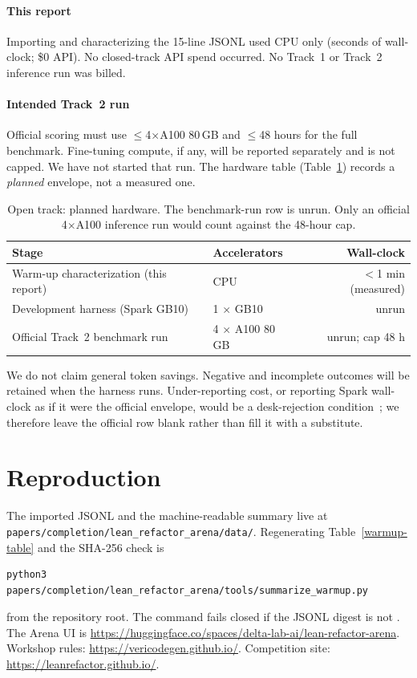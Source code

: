 \documentclass{article}
\begin{document}
\paragraph{This report} Importing and characterizing the 15-line JSONL used CPU only (seconds of wall-clock; \$0 API). No closed-track API spend occurred. No Track~1 or Track~2 inference run was billed.

\paragraph{Intended Track~2 run} Official scoring must use $\le$4$\times$A100 80\,GB and $\le$48 hours for the full benchmark. Fine-tuning compute, if any, will be reported separately and is not capped. We have not started that run. The hardware table (Table~\ref{hardware-table}) records a \emph{planned} envelope, not a measured one.

\begin{table}[!ht]
  \caption{Open track: planned hardware. The benchmark-run row is unrun. Only an official 4$\times$A100 inference run would count against the 48-hour cap.}
  \label{hardware-table}
  \centering
  \begin{tabular}{llr}
    \toprule
    Stage & Accelerators & Wall-clock \\
    \midrule
    Warm-up characterization (this report) & CPU & $<$1 min (measured) \\
    Development harness (Spark GB10) & 1 $\times$ GB10 & unrun \\
    Official Track~2 benchmark run & 4 $\times$ A100 80\,GB & unrun; cap 48 h \\
    \bottomrule
  \end{tabular}
\end{table}

We do not claim general token savings. Negative and incomplete outcomes will be retained when the harness runs. Under-reporting cost, or reporting Spark wall-clock as if it were the official envelope, would be a desk-rejection condition~\cite{vericodegen2026}; we therefore leave the official row blank rather than fill it with a substitute.

\section{Reproduction}

The imported JSONL and the machine-readable summary live at
\texttt{papers/completion/lean\_refactor\_arena/data/}.
Regenerating Table~\ref{warmup-table} and the SHA-256 check is
\begin{verbatim}
python3 papers/completion/lean_refactor_arena/tools/summarize_warmup.py
\end{verbatim}
from the repository root. The command fails closed if the JSONL digest is not
.
The Arena UI is \url{https://huggingface.co/spaces/delta-lab-ai/lean-refactor-arena}.
Workshop rules: \url{https://vericodegen.github.io/}.
Competition site: \url{https://leanrefactor.github.io/}.
\end{document}
